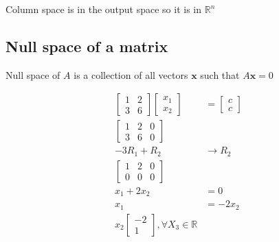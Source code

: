 \documentclass[main.tex]{subfiles}
\begin{document}
    Column space is in the output space so it is in $\mathbb{R}^{n}$

\subsection{Null space of a matrix} 

    Null space of $A$ is a collection of all vectors $\bm{x}$ such that $A \bm{x}=0$
    
    $$
    \begin{aligned}
    \left[\begin{array}{ll}
    1 & 2 \\
    3 & 6
    \end{array}\right]\left[\begin{array}{l}
    x_{1} \\
    x_{2}
    \end{array}\right] & =\left[\begin{array}{l}
    c \\
    c
    \end{array}\right]\\
    \left[\begin{array}{ll|l}
    1 & 2 & 0 \\
    3 & 6 & 0
    \end{array}\right] & \\
    -3R_{1}+R_{2} & \rightarrow R_2\\
    \left[\begin{array}{ll|l}
    1 & 2 & 0 \\
    0 & 0 & 0
    \end{array}\right] & \\
    x_1 + 2 x_2 & =0 \\
    x_1 & = -2 x_2 \\
    x_{2}\left[\begin{array}{c}
    -2 \\
    1
    \end{array}\right], \forall X_{3} \in \mathbb{R} &
    \end{aligned}
    $$
\end{document}
